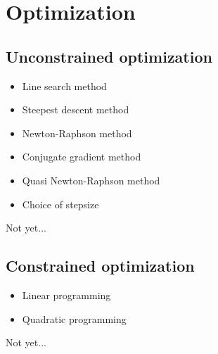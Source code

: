\section{Optimization}
\subsection{Unconstrained optimization}
\begin{itemize}
    \setlength\itemsep{0em}
    \item Line search method
    \item Steepest descent method
    \item Newton-Raphson method
    \item Conjugate gradient method
    \item Quasi Newton-Raphson method
    \item Choice of stepsize
\end{itemize}
Not yet...



\subsection{Constrained optimization}
\begin{itemize}
    \setlength\itemsep{0em}
    \item Linear programming
    \item Quadratic programming
\end{itemize}
Not yet...


